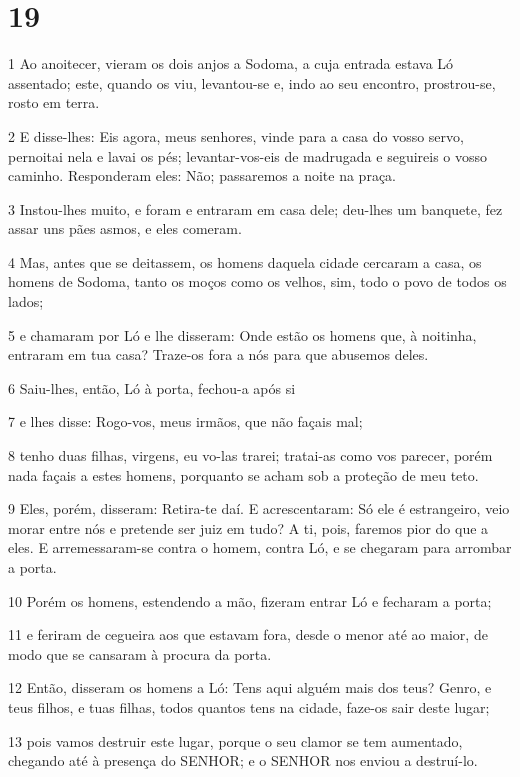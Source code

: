 \chapter{19}

\par 1 Ao anoitecer, vieram os dois anjos a Sodoma, a cuja entrada estava Ló assentado; este, quando os viu, levantou-se e, indo ao seu encontro, prostrou-se, rosto em terra.
\par 2 E disse-lhes: Eis agora, meus senhores, vinde para a casa do vosso servo, pernoitai nela e lavai os pés; levantar-vos-eis de madrugada e seguireis o vosso caminho. Responderam eles: Não; passaremos a noite na praça.
\par 3 Instou-lhes muito, e foram e entraram em casa dele; deu-lhes um banquete, fez assar uns pães asmos, e eles comeram.
\par 4 Mas, antes que se deitassem, os homens daquela cidade cercaram a casa, os homens de Sodoma, tanto os moços como os velhos, sim, todo o povo de todos os lados;
\par 5 e chamaram por Ló e lhe disseram: Onde estão os homens que, à noitinha, entraram em tua casa? Traze-os fora a nós para que abusemos deles.
\par 6 Saiu-lhes, então, Ló à porta, fechou-a após si
\par 7 e lhes disse: Rogo-vos, meus irmãos, que não façais mal;
\par 8 tenho duas filhas, virgens, eu vo-las trarei; tratai-as como vos parecer, porém nada façais a estes homens, porquanto se acham sob a proteção de meu teto.
\par 9 Eles, porém, disseram: Retira-te daí. E acrescentaram: Só ele é estrangeiro, veio morar entre nós e pretende ser juiz em tudo? A ti, pois, faremos pior do que a eles. E arremessaram-se contra o homem, contra Ló, e se chegaram para arrombar a porta.
\par 10 Porém os homens, estendendo a mão, fizeram entrar Ló e fecharam a porta;
\par 11 e feriram de cegueira aos que estavam fora, desde o menor até ao maior, de modo que se cansaram à procura da porta.
\par 12 Então, disseram os homens a Ló: Tens aqui alguém mais dos teus? Genro, e teus filhos, e tuas filhas, todos quantos tens na cidade, faze-os sair deste lugar;
\par 13 pois vamos destruir este lugar, porque o seu clamor se tem aumentado, chegando até à presença do SENHOR; e o SENHOR nos enviou a destruí-lo.
